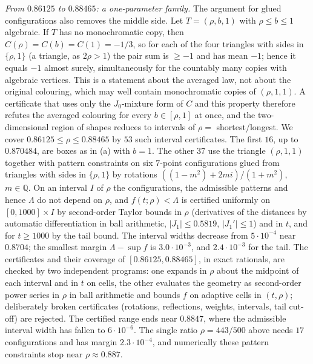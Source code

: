 \documentclass[11pt]{amsart}
\theoremstyle{definition}
\begin{document}
\emph{From $0.86125$ to $0.88465$: a one-parameter family.} The argument for glued configurations also removes the middle side. Let $T=(\rho,b,1)$ with $\rho\le b\le1$ algebraic. If $T$ has no monochromatic copy, then $C(\rho)=C(b)=C(1)=-1/3$, so for each of the four triangles with sides in $\{\rho,1\}$ (a triangle, as $2\rho>1$) the pair sum is $\ge-1$ and has mean $-1$; hence it equals $-1$ almost surely, simultaneously for the countably many copies with algebraic vertices. This is a statement about the averaged law, not about the original colouring, which may well contain monochromatic copies of $(\rho,1,1)$. A certificate that uses only the $J_0$-mixture form of $C$ and this property therefore refutes the averaged colouring for every $b\in[\rho,1]$ at once, and the two-dimensional region of shapes reduces to intervals of $\rho=$ shortest/longest. We cover $0.86125\le\rho\le0.88465$ by $53$ such interval certificates. The first $16$, up to $0.870484$, are boxes as in (a) with $b=1$. The other $37$ use the triangle $(\rho,1,1)$ together with pattern constraints on six $7$-point configurations glued from triangles with sides in $\{\rho,1\}$ by rotations $((1-m^2)+2mi)/(1+m^2)$, $m\in\mathbb Q$. On an interval $I$ of $\rho$ the configurations, the admissible patterns and hence $\Lambda$ do not depend on $\rho$, and $f(t;\rho)<\Lambda$ is certified uniformly on $[0,1000]\times I$ by second-order Taylor bounds in $\rho$ (derivatives of the distances by automatic differentiation in ball arithmetic, $|J_1|\le0.5819$, $|J_1'|\le1$) and in $t$, and for $t\ge1000$ by the tail bound. The interval widths decrease from $5\cdot10^{-4}$ near $0.8704$; the smallest margin $\Lambda-\sup f$ is $3.0\cdot10^{-3}$, and $2.4\cdot10^{-3}$ for the tail. The certificates and their coverage of $[0.86125,0.88465]$, in exact rationals, are checked by two independent programs: one expands in $\rho$ about the midpoint of each interval and in $t$ on cells, the other evaluates the geometry as second-order power series in $\rho$ in ball arithmetic and bounds $f$ on adaptive cells in $(t,\rho)$; deliberately broken certificates (rotations, reflections, weights, intervals, tail cut-off) are rejected. The certified range ends near $0.8847$, where the admissible interval width has fallen to $6\cdot10^{-6}$. The single ratio $\rho=443/500$ above needs $17$ configurations and has margin $2.3\cdot10^{-4}$, and numerically these pattern constraints stop near $\rho\approx0.887$.
\end{document}
